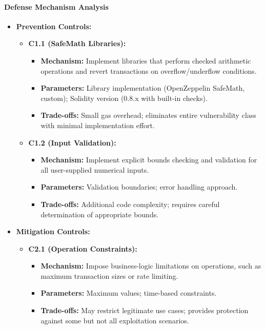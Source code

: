 \paragraph{Defense Mechanism Analysis}

\begin{itemize}
\item \textbf{Prevention Controls:}
    \begin{itemize}
    \item \textbf{C1.1 (SafeMath Libraries):}
        \begin{itemize}
        \item \textbf{Mechanism:} Implement libraries that perform checked arithmetic operations and revert transactions on overflow/underflow conditions.
        \item \textbf{Parameters:} Library implementation (OpenZeppelin SafeMath, custom); Solidity version (0.8.x with built-in checks).
        \item \textbf{Trade-offs:} Small gas overhead; eliminates entire vulnerability class with minimal implementation effort.
        \end{itemize}
    
    \item \textbf{C1.2 (Input Validation):}
        \begin{itemize}
        \item \textbf{Mechanism:} Implement explicit bounds checking and validation for all user-supplied numerical inputs.
        \item \textbf{Parameters:} Validation boundaries; error handling approach.
        \item \textbf{Trade-offs:} Additional code complexity; requires careful determination of appropriate bounds.
        \end{itemize}
    \end{itemize}

\item \textbf{Mitigation Controls:}
    \begin{itemize}
    \item \textbf{C2.1 (Operation Constraints):}
        \begin{itemize}
        \item \textbf{Mechanism:} Impose business-logic limitations on operations, such as maximum transaction sizes or rate limiting.
        \item \textbf{Parameters:} Maximum values; time-based constraints.
        \item \textbf{Trade-offs:} May restrict legitimate use cases; provides protection against some but not all exploitation scenarios.
        \end{itemize}
    

\end{itemize}
\end{itemize}
